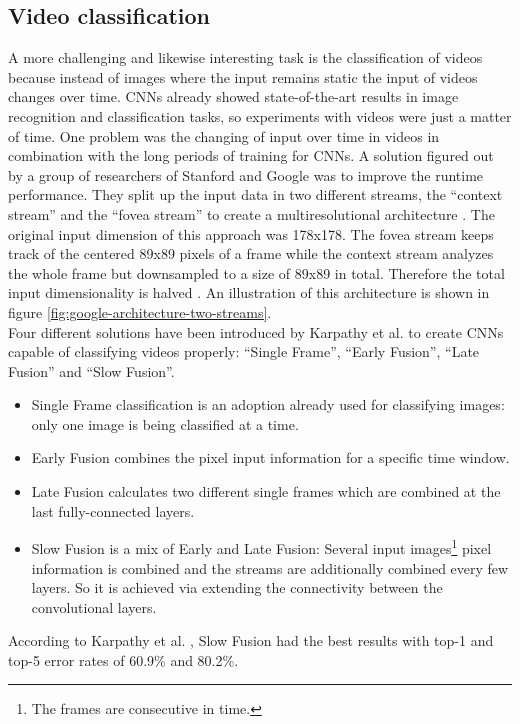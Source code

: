 \documentclass[12pt,twoside]{article}
\theoremstyle{plain}
\theoremstyle{definition}
\theoremstyle{remark}
\begin{document}
\subsection{Video classification}

A more challenging and likewise interesting task is the classification of videos because instead of images where the input remains static the input of videos changes over time.
CNNs already showed state-of-the-art results in image recognition and classification tasks, so experiments with videos were just a matter of time. One problem was the changing of input over time in videos in combination with the long periods of training for CNNs. A solution figured out by a group of researchers of Stanford and Google was to improve the runtime performance. They split up the input data in two different streams, the \enquote{context stream} and the \enquote{fovea stream} to create a multiresolutional architecture \cite{GoogleLargeScaleVideoClassification-Karpathy}.
The original input dimension of this approach was 178x178. The fovea stream keeps track of the centered 89x89 pixels of a frame while the context stream analyzes the whole frame but downsampled to a size of 89x89 in total. Therefore the total input dimensionality is halved \cite{GoogleLargeScaleVideoClassification-Karpathy}. An illustration of this architecture is shown in figure \ref{fig:google-architecture-two-streams}.
\\
Four different solutions have been introduced by Karpathy et al. \cite{GoogleLargeScaleVideoClassification-Karpathy} to create CNNs capable of classifying videos properly: \enquote{Single Frame}, \enquote{Early Fusion}, \enquote{Late Fusion} and \enquote{Slow Fusion}.
\begin{itemize}
	\item Single Frame classification is an adoption already used for classifying images: only one image is being classified at a time.
	\item Early Fusion combines the pixel input information for a specific time window.
	\item Late Fusion calculates two different single frames which are combined at the last fully-connected layers.
	\item Slow Fusion is a mix of Early and Late Fusion: Several input images\footnote{The frames are consecutive in time.} pixel information  is combined and the streams are additionally combined every few layers. So it is achieved via extending the connectivity between the convolutional layers.
\end{itemize}
According to Karpathy et al. \cite{GoogleLargeScaleVideoClassification-Karpathy}, Slow Fusion had the best results with top-1 and top-5 error rates of 60.9\% and 80.2\%.
\end{document}
